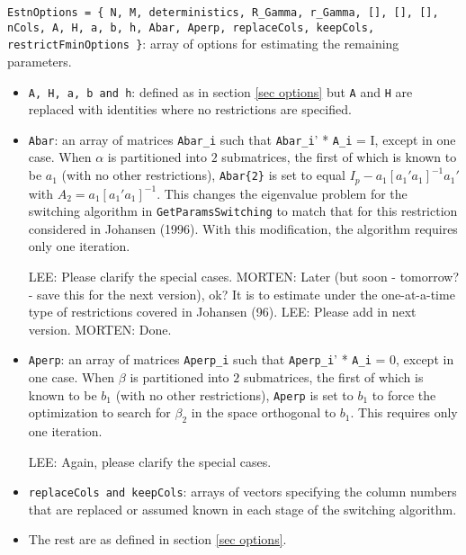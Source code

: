 \documentclass[12pt]{article}
\begin{document}
\noindent \texttt{EstnOptions = \{ N, M, deterministics, R\_Gamma, r\_Gamma, [], [], [], nCols, A, H, a, b, h, Abar, Aperp, replaceCols, keepCols, restrictFminOptions \}}: array of options for estimating the remaining parameters.

\begin{itemize}

\item \texttt{A, H, a, b and h}: defined as in section \ref{sec options} but \texttt{A} and \texttt{H} are replaced with identities where no restrictions are specified. 

\item \texttt{Abar}: an array of matrices \texttt{Abar\_i} such that \texttt{Abar\_i}' * \texttt{A\_i} = I, except in one case. When $\alpha$ is partitioned into $2$ submatrices, the first of which is known to be $a_1$ (with no other restrictions), \texttt{Abar\{2\}} is set to equal $I_p - a_1 [a_1' a_1]^{-1} a_1'$ with $A_2 = a_1 [a_1' a_1]^{-1}$. This changes the eigenvalue problem for the switching algorithm in \texttt{GetParamsSwitching} to match that for this restriction considered in Johansen (1996). With this modification, the algorithm requires only one iteration.

LEE: Please clarify the special cases.
MORTEN: Later (but soon - tomorrow? - save this for the next version), ok? It is to estimate under the one-at-a-time type of restrictions covered in Johansen (96).
LEE: Please add in next version.
MORTEN: Done.

\item \texttt{Aperp}: an array of matrices \texttt{Aperp\_i} such that \texttt{Aperp\_i}' * \texttt{A\_i} = 0, except in one case. When $\beta$ is partitioned into $2$ submatrices, the first of which is known to be $b_1$ (with no other restrictions), \texttt{Aperp} is set to $b_1$ to force the optimization to search for $\beta_2$ in the space orthogonal to $b_1$. This requires only one iteration.

LEE: Again, please clarify the special cases.

\item \texttt{replaceCols and keepCols}: arrays of vectors specifying the column numbers that are replaced or assumed known in each stage of the switching algorithm. 

\item The rest are as defined in section \ref{sec options}.

\end{itemize}
\end{document}
